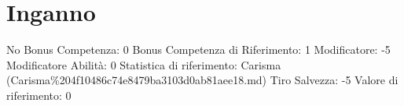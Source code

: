 \section{Inganno}\label{inganno}

\begin{description}
\tightlist
\item[Tags: ABI]
No Bonus Competenza: 0 Bonus Competenza di Riferimento: 1 Modificatore:
-5 Modificatore Abilità: 0 Statistica di riferimento: Carisma
(Carisma\%204f10486c74e8479ba3103d0ab81aee18.md) Tiro Salvezza: -5
Valore di riferimento: 0
\end{description}
